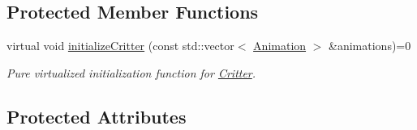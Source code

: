 \subsection*{Protected Member Functions}
\begin{DoxyCompactItemize}
\item 
virtual void \hyperlink{class_critter_ad425da71f01445ee175e5f98d94ca0ba}{initialize\+Critter} (const std\+::vector$<$ \hyperlink{class_animation}{Animation} $>$ \&animations)=0
\begin{DoxyCompactList}\small\item\em Pure virtualized initialization function for \hyperlink{class_critter}{Critter}. \end{DoxyCompactList}\end{DoxyCompactItemize}
\subsection*{Protected Attributes}
